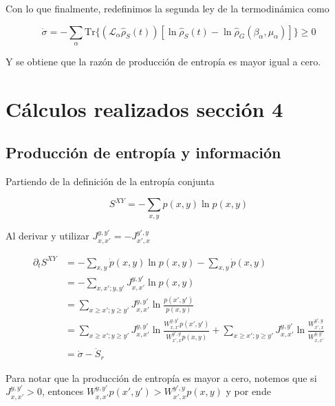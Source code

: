 \begin{appendixs}
Con lo que finalmente, redefinimos la segunda ley de la termodinámica como

\begin{equation*}
    \dot{\sigma} = - \sum_{\alpha} \text{Tr}\{(\mathcal{L}_{\alpha}\hat{\rho}_{S}(t)) [\ln \hat{\rho}_{S}(t) -\ln \hat{\rho}_{G}(\beta_{\alpha},\mu_{\alpha}) ] \} \geq 0
\end{equation*}

Y se obtiene que la razón de producción de entropía es mayor igual a cero.

\label{apendix:thermolaws}

\newpage 

    \section{Cálculos realizados sección 4}
    \subsection{Producción de entropía y información}
    Partiendo de la definición de la entropía conjunta

    \begin{equation*}
        S^{XY} = - \sum_{x,y}p(x,y) \ln p(x,y)
    \end{equation*}

    Al derivar y utilizar $J_{x,x'}^{y,y'} = - J_{x',x}^{y',y}$

    \begin{align*}
        \partial_{t}S^{XY} & = - \sum_{x,y} \dot{p}(x,y) \ln p(x,y) - \sum_{x,y} \dot{p}(x,y) \\
                           & = - \sum_{x,x';y,y'} J_{x,x'}^{y,y'} \ln p(x,y)  \\
                           & = \sum_{x \geq x'; y\geq y'} J_{x,x'}^{y,y'} \ln \frac{p(x',y')}{p(x,y)} \\
                           & = \sum_{x \geq x'; y\geq y'} J_{x,x'}^{y,y'} \ln \frac{W_{x,x'}^{y,y'} p(x',y')}{W_{x',x}^{y',y} p(x,y)} +  \sum_{x \geq x'; y\geq y'} J_{x,x'}^{y,y'} \ln \frac{W_{x',x}^{y',y} }{W_{x,x'}^{y,y'} } \\
                           & = \dot{\sigma} - \dot{S}_{r}
    \end{align*}

Para notar que la producción de entropía es mayor a cero, notemos que si $J_{x,x'}^{y,y'} > 0$, entonces $W_{x,x'}^{y,y'}p(x',y') > W_{x',x}^{y',y}p(x,y) $  y por ende


\end{appendixs}
